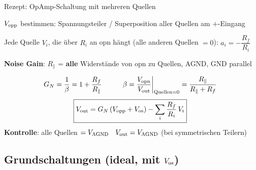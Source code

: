 \begin{rezept}{Rezept: OpAmp-Schaltung mit mehreren Quellen}
	\begin{steps}
		\item $V_{\rm opp}$ bestimmen: Spannungsteiler / Superposition aller Quellen am $+$-Eingang
		\item Jede Quelle $V_i$, die über $R_i$ an opn hängt (alle anderen Quellen $=0$):
		      \; $a_i = -\dfrac{R_f}{R_i}$
		\item \textbf{Noise Gain}: $R_\parallel$ = \textbf{alle} Widerstände von opn zu Quellen, AGND, GND parallel
	\end{steps}
	$$ G_N = \frac{1}{\beta} = 1 + \frac{R_f}{R_\parallel} \qquad\quad
	   \beta = \frac{V_{\rm opn}}{V_{\rm out}}\bigg|_{\text{Quellen}=0} = \frac{R_\parallel}{R_\parallel + R_f} $$
	$$ \boxed{ V_{\rm out} = G_N \,(V_{\rm opp} + V_{\rm os}) - \sum_i \frac{R_f}{R_i}\,V_i } $$
	\textbf{Kontrolle}: alle Quellen $= V_{\rm AGND}$ \textrightarrow\ $V_{\rm out} = V_{\rm AGND}$ (bei symmetrischen Teilern)
\end{rezept}

\subsection{Grundschaltungen (ideal, mit $V_{\rm os}$)}\label{sec:opamp-grund}

